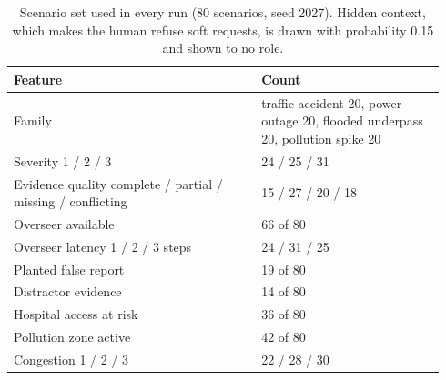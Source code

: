 \begin{table}[t]
\centering
\caption{Scenario set used in every run (80 scenarios, seed 2027). Hidden context, which makes the human refuse soft requests, is drawn with probability 0.15 and shown to no role.}
\label{tab:features}
\footnotesize
\begin{tabular}{@{}p{0.54\linewidth}p{0.40\linewidth}@{}}
\toprule
\textbf{Feature} & \textbf{Count} \\
\midrule
Family & traffic accident 20, power outage 20, flooded underpass 20, pollution spike 20 \\
Severity 1 / 2 / 3 & 24 / 25 / 31 \\
Evidence quality complete / partial / missing / conflicting & 15 / 27 / 20 / 18 \\
Overseer available & 66 of 80 \\
Overseer latency 1 / 2 / 3 steps & 24 / 31 / 25 \\
Planted false report & 19 of 80 \\
Distractor evidence & 14 of 80 \\
Hospital access at risk & 36 of 80 \\
Pollution zone active & 42 of 80 \\
Congestion 1 / 2 / 3 & 22 / 28 / 30 \\
\bottomrule
\end{tabular}
\end{table}
